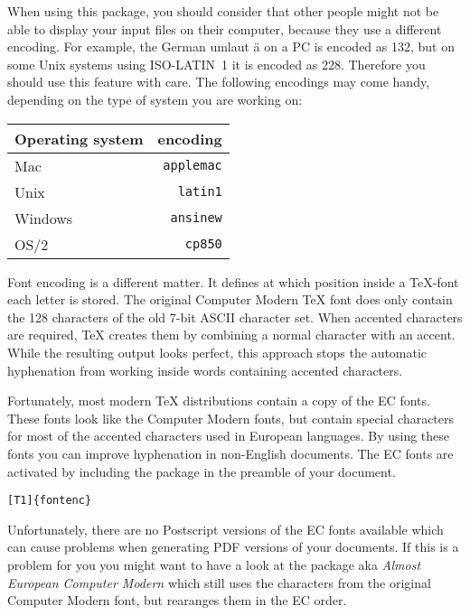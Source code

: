 When using this package, you should consider
that other people might not be able to display your input files on
their computer, because they use a different encoding. For example,
the German umlaut \"a on a PC is encoded as 132, but on some Unix
systems using ISO-LATIN~1 it is encoded as 228. Therefore you should
use this feature with care. The following encodings may come handy,
depending on the type of system you are working on: 

\begin{center}
\begin{tabular}{l | r}
Operating system & encoding\\
\hline
Mac     &  \texttt{applemac} \\
Unix    &  \texttt{latin1} \\ 
Windows &  \texttt{ansinew} \\
OS/2    &  \texttt{cp850}
\end{tabular}
\end{center}

Font encoding is a different matter. It defines at which position inside
a \TeX-font each letter is stored. The original Computer Modern
\TeX{} font does only contain the 128 characters of the old 7-bit ASCII
character set. When accented characters are required, \TeX{} creates
them by combining a normal character with an accent. While the
resulting output looks perfect, this approach stops the automatic
hyphenation from working inside words containing accented characters.

Fortunately, most modern \TeX{} distributions contain a copy of the EC
fonts. These fonts look like the Computer Modern fonts, but contain
special characters for most of the accented characters used in
European languages. By using these fonts you can improve hyphenation
in non-English documents. The EC fonts are activated by including the
 package in the preamble of your document.

\begin{lscommand}
\verb|[T1]{fontenc}| 
\end{lscommand}

Unfortunately, there are no Postscript versions of the EC fonts available
which can cause problems when generating PDF versions of your documents. If
this is a problem for you you might want to have a look at the 
package aka \emph{Almost European Computer Modern} which still uses the
characters from the original Computer Modern font, but rearanges them in the
EC order.


